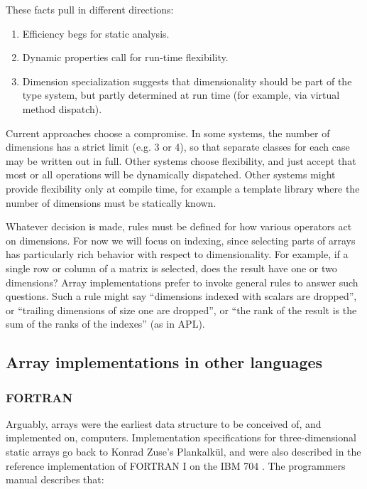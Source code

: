 \documentclass[preprint]{sigplanconf}
\begin{document}
These facts pull in different directions:

\begin{enumerate}

\item Efficiency begs for static analysis.

\item Dynamic properties call for run-time flexibility. 

\item Dimension specialization suggests that dimensionality should be part of the type system, but partly determined at run time (for example, via virtual method dispatch).

\end{enumerate}

Current approaches choose a compromise. In some systems, the number of
dimensions has a strict limit (e.g. 3 or 4), so that separate classes for each
case may be written out in full. Other systems choose flexibility, and just
accept that most or all operations will be dynamically dispatched. Other
systems might provide flexibility only at compile time, for example a template
library where the number of dimensions must be statically known.


Whatever decision is made, rules must be defined for how various operators act
on dimensions. For now we will focus on indexing, since selecting parts of
arrays has particularly rich behavior with respect to dimensionality. For
example, if a single row or column of a matrix is selected, does the result
have one or two dimensions? Array implementations prefer to invoke general
rules to answer such questions. Such a rule might say ``dimensions indexed
with scalars are dropped'', or ``trailing dimensions of size one are
dropped'', or ``the rank of the result is the sum of the ranks of the
indexes'' (as in APL).

\subsection{Array implementations in other languages}

\subsubsection{FORTRAN}

Arguably, arrays were the earliest data structure to be conceived of, and
implemented on, computers. Implementation specifications for three-dimensional
static arrays go back to Konrad Zuse's Plankalk\"ul, and were also described
in the reference implementation of FORTRAN I on the IBM 704
\cite{Backus:1957fa}. The programmers manual \cite[pp.~10--11]{Backus:1956pr}
describes that:
\end{document}
